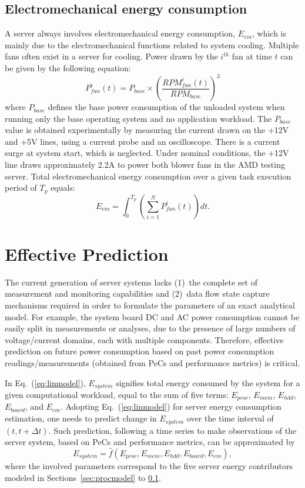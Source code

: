 \documentclass[prodmode,acmtaco,pdftex]{acmsmall}
\newcommand{\equationname}{Eq.}
\begin{document}
\subsection{Electromechanical energy consumption}
\label{sec:electrical}
A server always involves electromechanical energy consumption, $E_{em}$,
which is mainly due to the electromechanical functions related to system
cooling.  Multiple fans often exist in a server for cooling.  Power
drawn by the $i^{th}$ fan at time $t$ can be given by the following
equation:
\begin{equation}
\label{eq:fanp}
P_{fan}^{i}(t) = P_{base} \times \left(\frac{RPM_{fan}^{i}(t)}{RPM_{base}}\right)^3
\end{equation} 
where $P_{base}$ defines the base power consumption of the unloaded system
when running only the base operating system and no application workload.
The $P_{base}$ value is obtained experimentally by measuring the current drawn
on the +12V and +5V lines, using a current probe and an oscilloscope.
There is a current surge at system start, which is neglected.
Under nominal conditions, the +12V line draws approximately 2.2A
to power both blower fans in the AMD testing server. Total electromechanical energy consumption over a given task execution
period of $T_{p}$ equals:
\begin{equation*}
\label{eq:elect}
E_{em} =  \int^{T_{p}}_0 \left(\sum_{i=1}^NP_{fan}^{i}(t)\right)dt.
\end{equation*} 
\section{Effective Prediction}
\label{sec:application}
The current generation of server systems lacks (1)~the complete set of
measurement and monitoring capabilities and (2)~data flow state capture
mechanisms required in order to formulate the parameters of an exact
analytical model.  For example, the system board DC and AC power
consumption cannot be easily split in measurements or analyses, due to
the presence of large numbers of voltage/current domains, each with
multiple components.  Therefore, effective prediction on future power
consumption based on past power consumption readings/measurements
(obtained from PeCs and performance metrics) is critical.

In \equationname~(\ref{eq:linmodel}), $E_{system }$ signifies total
energy consumed by the system for a given computational workload, equal
to the sum of five terms: $E_{proc}$, $E_{mem}$, $E_{hdd}$, $E_{board}$,
and $E_{em}$.  Adopting \equationname~(\ref{eq:linmodel}) for server
energy consumption estimation, one needs to predict change in
$E_{system}$ over the time interval of $(t, t+\Delta t)$.  Such
prediction, following a time series to make observations of the server
system, based on PeCs and performance metrics, can be approximated by
\begin{equation}
\label{eq:tseries}
E_{system} = \hat{f}(E_{proc}, E_{mem}, E_{hdd}, E_{board}, E_{em}),
\end{equation}
where the involved parameters correspond to the five server energy
contributors modeled in Sections~\ref{sec:procmodel} to \ref{sec:electrical}.
\end{document}
